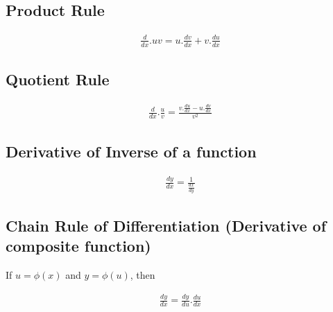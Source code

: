 \subsection{ Product Rule}
\begin{tcolorbox}
\begin{center}
\begin{align*}
\frac{d}{dx}.uv= u.\frac{dv}{dx} + v.\frac{du}{dx}
\end{align*}
\end{center}
\end{tcolorbox}

\subsection{ Quotient Rule}
\begin{tcolorbox}
\begin{center}
\begin{align*}
\frac{d}{dx}.\frac{u}{v} = \frac{v.\frac{du}{dx} - u.\frac{dv}{dx}}{v^2}
\end{align*}
\end{center}
\end{tcolorbox}

\subsection{ Derivative of Inverse of a function}
\begin{tcolorbox}
\begin{center}
\begin{align*}
\frac{dy}{dx} = \frac{1}{\frac{dx}{dy}}
\end{align*}
\end{center}
\end{tcolorbox}

\subsection{ Chain Rule of Differentiation (Derivative of composite function)}
If $u = \phi(x)$ and $y = \phi(u)$, then \\
\begin{tcolorbox}
\begin{center}
\begin{align*}
\frac{dy}{dx} = \frac{dy}{du}.\frac{du}{dx} 
\end{align*}
\end{center}
\end{tcolorbox}

